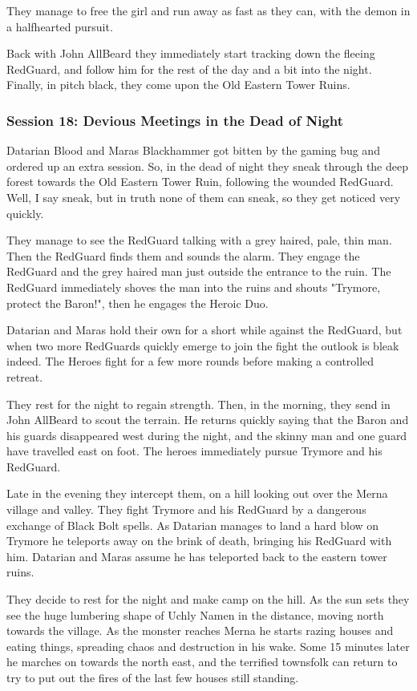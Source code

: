 They manage to free the girl and run away as fast as they can, with the demon in a halfhearted pursuit.

Back with John AllBeard they immediately start tracking down the fleeing RedGuard, and follow him for the rest of the day and a bit into the night. Finally, in pitch black, they come upon the Old Eastern Tower Ruins.


\subsubsection*{Session 18: Devious Meetings in the Dead of Night}
Datarian Blood and Maras Blackhammer got bitten by the gaming bug and ordered up an extra session. So, in the dead of night they sneak through the deep forest towards the Old Eastern Tower Ruin, following the wounded RedGuard. Well, I say sneak, but in truth none of them can sneak, so they get noticed very quickly.

They manage to see the RedGuard talking with a grey haired, pale, thin man. Then the RedGuard finds them and sounds the alarm. They engage the RedGuard and the grey haired man just outside the entrance to the ruin. The RedGuard immediately shoves the man into the ruins and shouts "Trymore, protect the Baron!", then he engages the Heroic Duo.

Datarian and Maras hold their own for a short while against the RedGuard, but when two more RedGuards quickly emerge to join the fight the outlook is bleak indeed. The Heroes fight for a few more rounds before making a controlled retreat.

They rest for the night to regain strength. Then, in the morning, they send in John AllBeard to scout the terrain. He returns quickly saying that the Baron and his guards disappeared west during the night, and the skinny man and one guard have travelled east on foot. The heroes immediately pursue Trymore and his RedGuard.

Late in the evening they intercept them, on a hill looking out over the Merna village and valley. They fight Trymore and his RedGuard by a dangerous exchange of Black Bolt spells. As Datarian manages to land a hard blow on Trymore he teleports away on the brink of death, bringing his RedGuard with him.
Datarian and Maras assume he has teleported back to the eastern tower ruins.

They decide to rest for the night and make camp on the hill. As the sun sets they see the huge lumbering shape of Uchly Namen in the distance, moving north towards the village.
As the monster reaches Merna he starts razing houses and eating things, spreading chaos and destruction in his wake. Some 15 minutes later he marches on towards the north east, and the terrified townsfolk can return to try to put out the fires of the last few houses still standing.

